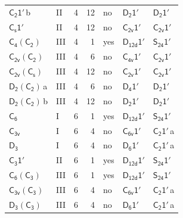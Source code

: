 \documentclass[10pt,a4paper]{article}
\numberwithin{equation}{section}
\newcommand{\grp}[1]{\mathsf{#1}}
\newcommand{\clsletter}[1]{\,{\scriptsize\color{black!55}#1}}
\begin{document}
{\begin{longtable}{@{}llrrlll@{}}
\href{C2-1p.pdf}{$\grp{C_{2}1'}$}\clsletter{b} & II & 4 & 12 & no & \href{D2-1p.pdf}{$\grp{D_{2}1'}$} & \href{D2-1p.pdf}{$\grp{D_{2}1'}$}\\
\href{C1v-1p.pdf}{$\grp{C_{s}1'}$} & II & 4 & 12 & no & \href{C2v-1p.pdf}{$\grp{C_{2v}1'}$} & \href{C2v-1p.pdf}{$\grp{C_{2v}1'}$}\\
\href{C4-C2.pdf}{$\grp{C_{4}}(\grp{C_{2}})$} & III & 4 & 1 & yes & \href{D12d-1p.pdf}{$\grp{D_{12d}1'}$} & \href{S24-1p.pdf}{$\grp{S_{24}1'}$}\\
\href{C2v-C2.pdf}{$\grp{C_{2v}}(\grp{C_{2}})$} & III & 4 & 6 & no & \href{C4v-1p.pdf}{$\grp{C_{4v}1'}$} & \href{C2v-1p.pdf}{$\grp{C_{2v}1'}$}\\
\href{C2v-C1v.pdf}{$\grp{C_{2v}}(\grp{C_{s}})$} & III & 4 & 12 & no & \href{C2v-1p.pdf}{$\grp{C_{2v}1'}$} & \href{C2v-1p.pdf}{$\grp{C_{2v}1'}$}\\
\href{D2-C2.pdf}{$\grp{D_{2}}(\grp{C_{2}})$}\clsletter{a} & III & 4 & 6 & no & \href{D4-1p.pdf}{$\grp{D_{4}1'}$} & \href{D2-1p.pdf}{$\grp{D_{2}1'}$}\\
\href{D2-C2.pdf}{$\grp{D_{2}}(\grp{C_{2}})$}\clsletter{b} & III & 4 & 12 & no & \href{D2-1p.pdf}{$\grp{D_{2}1'}$} & \href{D2-1p.pdf}{$\grp{D_{2}1'}$}\\
\href{../../../rotation/data/pdf/C6.pdf}{$\grp{C_{6}}$} & I & 6 & 1 & yes & \href{D12d-1p.pdf}{$\grp{D_{12d}1'}$} & \href{S24-1p.pdf}{$\grp{S_{24}1'}$}\\
\href{../../../rotation/data/pdf/C3v.pdf}{$\grp{C_{3v}}$} & I & 6 & 4 & no & \href{C6v-1p.pdf}{$\grp{C_{6v}1'}$} & \href{C2-1p.pdf}{$\grp{C_{2}1'}$}\clsletter{a}\\
\href{../../../rotation/data/pdf/D3.pdf}{$\grp{D_{3}}$} & I & 6 & 4 & no & \href{D6-1p.pdf}{$\grp{D_{6}1'}$} & \href{C2-1p.pdf}{$\grp{C_{2}1'}$}\clsletter{a}\\
\href{C3-1p.pdf}{$\grp{C_{3}1'}$} & II & 6 & 1 & yes & \href{D12d-1p.pdf}{$\grp{D_{12d}1'}$} & \href{S24-1p.pdf}{$\grp{S_{24}1'}$}\\
\href{C6-C3.pdf}{$\grp{C_{6}}(\grp{C_{3}})$} & III & 6 & 1 & yes & \href{D12d-1p.pdf}{$\grp{D_{12d}1'}$} & \href{S24-1p.pdf}{$\grp{S_{24}1'}$}\\
\href{C3v-C3.pdf}{$\grp{C_{3v}}(\grp{C_{3}})$} & III & 6 & 4 & no & \href{C6v-1p.pdf}{$\grp{C_{6v}1'}$} & \href{C2-1p.pdf}{$\grp{C_{2}1'}$}\clsletter{a}\\
\href{D3-C3.pdf}{$\grp{D_{3}}(\grp{C_{3}})$} & III & 6 & 4 & no & \href{D6-1p.pdf}{$\grp{D_{6}1'}$} & \href{C2-1p.pdf}{$\grp{C_{2}1'}$}\clsletter{a}\\

\end{longtable}}
\end{document}

